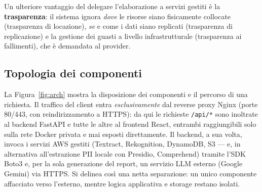 \documentclass[11pt,a4paper]{article}
\begin{document}
Un ulteriore vantaggio del delegare l'elaborazione a servizi gestiti è la
\textbf{trasparenza}: il sistema ignora \emph{dove} le risorse siano fisicamente
collocate (trasparenza di locazione), \emph{se} e come i dati siano replicati
(trasparenza di replicazione) e la gestione dei guasti a livello infrastrutturale
(trasparenza ai fallimenti), che è demandata al provider.

\subsection{Topologia dei componenti}
La Figura~\ref{fig:arch} mostra la disposizione dei componenti e il percorso di una
richiesta. Il traffico del client entra \emph{esclusivamente} dal reverse proxy Nginx
(porte 80/443, con reindirizzamento a HTTPS): da qui le richieste \texttt{/api/*} sono
inoltrate al backend FastAPI e tutte le altre al frontend React, entrambi raggiungibili
solo sulla rete Docker privata e mai esposti direttamente. Il backend, a sua volta,
invoca i servizi AWS gestiti (Textract, Rekognition, DynamoDB, S3 --- e, in alternativa
all'estrazione PII locale con Presidio, Comprehend) tramite l'SDK Boto3 e, per la sola
generazione del report, un servizio LLM esterno (Google Gemini) via HTTPS. Si
delinea così una netta separazione: un unico componente affacciato verso l'esterno,
mentre logica applicativa e storage restano isolati.
\end{document}
